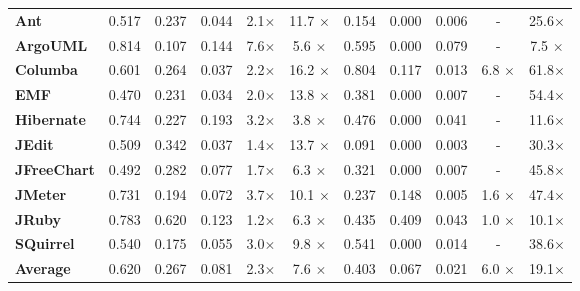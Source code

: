 \begin{landscape}
\begin{table}[!thb]
{\begin{tabular}{l| c c c c c| c c c c c}
        \midrule                                                  
        \textbf{Ant}       &0.517&0.237&0.044&2.1$\times$& 11.7 $\times$&0.154&0.000&0.006&-             & 25.6$\times$  \\
        \textbf{ArgoUML}   &0.814&0.107&0.144&7.6$\times$& 5.6  $\times$&0.595&0.000&0.079&-             & 7.5 $\times$  \\
        \textbf{Columba}   &0.601&0.264&0.037&2.2$\times$& 16.2 $\times$&0.804&0.117&0.013&6.8  $\times$ & 61.8$\times$  \\
        \textbf{EMF}       &0.470&0.231&0.034&2.0$\times$& 13.8 $\times$&0.381&0.000&0.007&-             & 54.4$\times$  \\
        \textbf{Hibernate} &0.744&0.227&0.193&3.2$\times$& 3.8  $\times$&0.476&0.000&0.041&-             & 11.6$\times$  \\
        \textbf{JEdit}     &0.509&0.342&0.037&1.4$\times$& 13.7 $\times$&0.091&0.000&0.003&-             & 30.3$\times$  \\
        \textbf{JFreeChart}&0.492&0.282&0.077&1.7$\times$& 6.3  $\times$&0.321&0.000&0.007&-             & 45.8$\times$  \\
        \textbf{JMeter}    &0.731&0.194&0.072&3.7$\times$& 10.1 $\times$&0.237&0.148&0.005&1.6 $\times$  & 47.4$\times$  \\
        \textbf{JRuby}     &0.783&0.620&0.123&1.2$\times$& 6.3  $\times$&0.435&0.409&0.043&1.0 $\times$  & 10.1$\times$  \\
        \textbf{SQuirrel}  &0.540&0.175&0.055&3.0$\times$& 9.8  $\times$&0.541&0.000&0.014&-             & 38.6$\times$  \\
        \midrule 
        \textbf{Average}   &0.620&0.267&0.081&2.3$\times$&7.6   $\times$&0.403&0.067&0.021&6.0 $\times$  & 19.1$\times$ \\ 
        \bottomrule
        \end{tabular}
    }    
\end{table}
\end{landscape}


